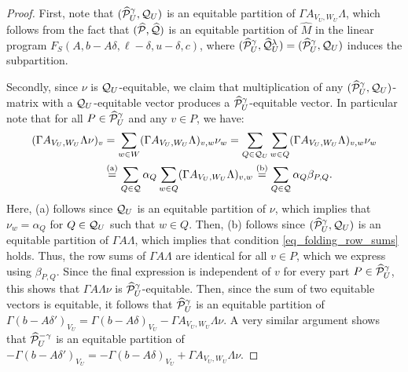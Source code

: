 \documentclass[pdflatex,sn-mathphys-num]{sn-jnl}%
\theoremstyle{thmstyleone}%
\theoremstyle{thmstylethree}%
\theoremstyle{thmstyletwo}%
\begin{document}
\begin{proof}
    First, note that $(\widehat{\mathcal{P}}^\gamma_U,\mathcal{Q}_U)$ is an equitable partition of $\Gamma A_{V_U,W_U} \Lambda$, which follows from the fact that $(\widehat{\mathcal{P}},\widehat{\mathcal{Q}})$ is an equitable partition of $\widehat{M}$ in the linear program $F_S(A,b- A \delta, \ell- \delta, u - \delta,c)$, where $(\widehat{\mathcal{P}}^\gamma_U,\widehat{\mathcal{Q}}^\lambda_U) = (\widehat{\mathcal{P}}^\gamma_U,\mathcal{Q}_U)$ induces the subpartition.

    Secondly, since $\nu$ is $\mathcal{Q}_U$-equitable, we claim that multiplication of any $(\widehat{\mathcal{P}}^\gamma_U,\mathcal{Q}_U)$-matrix with a $\mathcal{Q}_U$-equitable vector produces a $\widehat{\mathcal{P}}^\gamma_U$-equitable vector. In particular note that for all $P\in \widehat{\mathcal{P}}^\gamma_U$ and any $v\in P$, we have:
    \begin{align*}
        (\Gamma A_{V_U,W_U} \Lambda \nu)_v &= \sum_{w\in W} (\Gamma A_{V_U,W_U} \Lambda)_{v,w} \nu_{w} = \sum_{Q\in \mathcal{Q}_U} \sum_{w\in Q} (\Gamma A_{V_U,W_U} \Lambda)_{v,w} \nu_{w} \\ &\stackrel{\textup{(a)}}{=} \sum_{Q\in \mathcal{Q}} \alpha_{Q} \sum_{w\in Q} (\Gamma A_{V_U,W_U} \Lambda)_{v,w} \stackrel{\textup{(b)}} = \sum_{Q\in \mathcal{Q}} \alpha_{Q} \beta_{P,Q}.
    \end{align*}
    Here, \textup{(a)} follows since $\mathcal{Q}_U$ is an equitable partition of $\nu$, which implies that $\nu_w = \alpha_{Q}$ for $Q\in \mathcal{Q}_U$ such that $w\in Q$. Then, \textup{(b)} follows since $(\widehat{\mathcal{P}}^\gamma_U,\mathcal{Q}_U)$ is an equitable partition of $\Gamma A \Lambda$, which implies that condition \eqref{eq_folding_row_sums} holds. Thus, the row sums of $\Gamma A \Lambda$ are identical for all $v\in P$, which we express using $\beta_{P,Q}$. Since the final expression is independent of $v$ for every part $P\in \widehat{\mathcal{P}}^\gamma_U$, this shows that $\Gamma A \Lambda \nu$ is $\widehat{\mathcal{P}}^\gamma_U$-equitable. Then, since the sum of two equitable vectors is equitable, it follows that $\widehat{\mathcal{P}}^\gamma_U$ is an equitable partition of $\Gamma ( b- A \delta')_{V_U} = \Gamma(b- A \delta)_{V_U} - \Gamma A_{V_U,W_U} \Lambda \nu$.
    A very similar argument shows that $\widehat{\mathcal{P}}^{-\gamma}_U$ is an equitable partition of $-\Gamma ( b- A \delta')_{V_U} = -\Gamma(b- A \delta)_{V_U} + \Gamma A_{V_U,W_U} \Lambda \nu$.


\end{proof}
\end{document}
